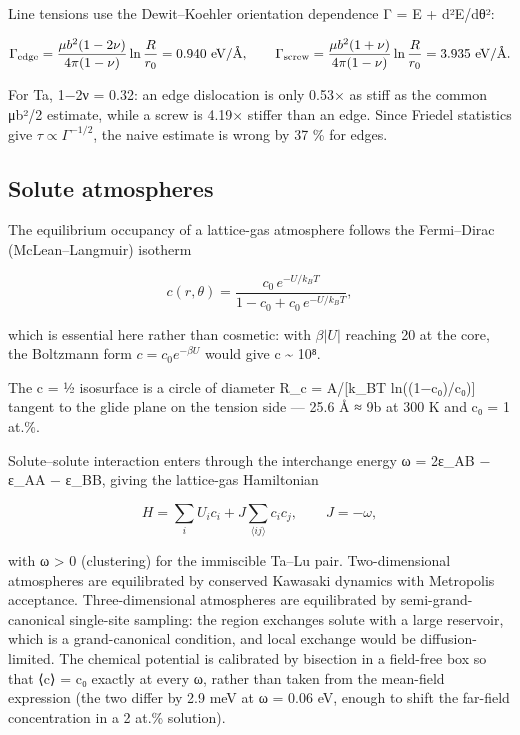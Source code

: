 Line tensions use the Dewit--Koehler orientation dependence Γ = E + d²E/dθ²:

\[\Gamma_{\rm edge} = \frac{\mu b^2(1-2\nu)}{4\pi(1-\nu)}\ln\frac{R}{r_0} = 0.940\ \text{eV/\AA},\qquad \Gamma_{\rm screw} = \frac{\mu b^2(1+\nu)}{4\pi(1-\nu)}\ln\frac{R}{r_0} = 3.935\ \text{eV/\AA}.\]

For Ta, 1−2ν = 0.32: an edge dislocation is only 0.53× as stiff as the common μb²/2 estimate, while a screw is 4.19× stiffer than an edge. Since Friedel statistics give \(\tau \propto \Gamma^{-1/2}\), the naive estimate is wrong by 37 \% for edges.

\hypertarget{solute-atmospheres}{%
\subsection{Solute atmospheres}\label{sec:solute-atmospheres}}

The equilibrium occupancy of a lattice-gas atmosphere follows the Fermi--Dirac (McLean--Langmuir) isotherm

\[c(r,\theta) = \frac{c_0\,e^{-U/k_BT}}{1 - c_0 + c_0\,e^{-U/k_BT}},\]

which is essential here rather than cosmetic: with \(\beta|U|\) reaching 20 at the core, the Boltzmann form \(c = c_0 e^{-\beta U}\) would give c \textasciitilde{} 10⁸.

The c = ½ isosurface is a circle of diameter R\_c = A/{[}k\_BT ln((1−c₀)/c₀){]} tangent to the glide plane on the tension side --- 25.6 Å ≈ 9b at 300 K and c₀ = 1 at.\%.

Solute--solute interaction enters through the interchange energy ω = 2ε\_AB − ε\_AA − ε\_BB, giving the lattice-gas Hamiltonian

\[H = \sum_i U_i c_i + J\sum_{\langle ij\rangle} c_i c_j,\qquad J = -\omega,\]

with ω \textgreater{} 0 (clustering) for the immiscible Ta--Lu pair. Two-dimensional atmospheres are equilibrated by conserved Kawasaki dynamics with Metropolis acceptance. Three-dimensional atmospheres are equilibrated by semi-grand-canonical single-site sampling: the region exchanges solute with a large reservoir, which is a grand-canonical condition, and local exchange would be diffusion-limited. The chemical potential is calibrated by bisection in a field-free box so that ⟨c⟩ = c₀ exactly at every ω, rather than taken from the mean-field expression (the two differ by 2.9 meV at ω = 0.06 eV, enough to shift the far-field concentration in a 2 at.\% solution).

